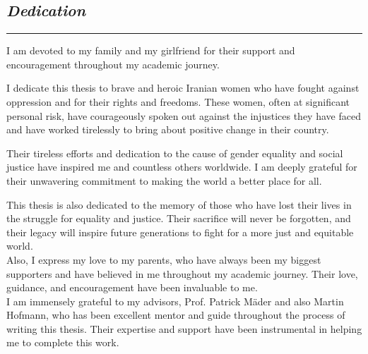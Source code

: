 \thispagestyle{empty}

\begin{center}
    \subsection*{\centering\textit{Dedication}}

    \rule{\linewidth}{0.5pt}

    {\selectfont
        I am devoted to my family and my girlfriend for their support and encouragement throughout my academic journey.

        I dedicate this thesis to brave and heroic Iranian women who have fought against oppression and for their rights and freedoms. These women, often at significant personal risk, have courageously spoken out against the injustices they have faced and have worked tirelessly to bring about positive change in their country.

        Their tireless efforts and dedication to the cause of gender equality and social justice have inspired me and countless others worldwide. I am deeply grateful for their unwavering commitment to making the world a better place for all.

        This thesis is also dedicated to the memory of those who have lost their lives in the struggle for equality and justice. Their sacrifice will never be forgotten, and their legacy will inspire future generations to fight for a more just and equitable world.
        \\\vspace{1cm}
        Also, I express my love to my parents, who have always been my biggest supporters and have believed in me throughout my academic journey. Their love, guidance, and encouragement have been invaluable to me.
        \\\vspace{1cm}
        I am immensely grateful to my advisors, Prof. Patrick Mäder and also Martin Hofmann, who has been excellent mentor and guide throughout the process of writing this thesis. Their expertise and support have been instrumental in helping me to complete this work.
    }

\end{center}

\normalfont
\newpage